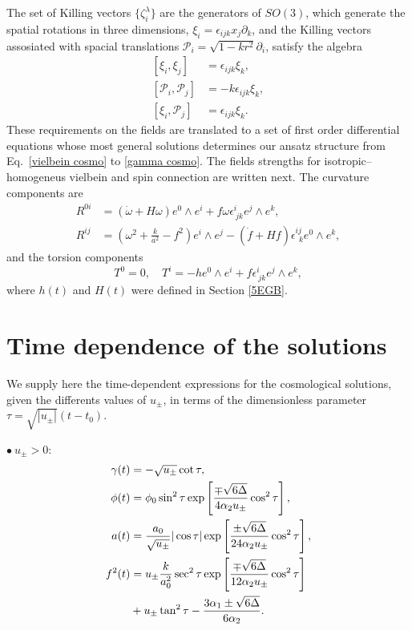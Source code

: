 \documentclass[aps,prd,12pt,superscriptaddress,showpacs,showkeys,longbibliography,reprint,nofootinbib]{revtex4-1}
\begin{document}
The set of Killing vectors $\{\zeta^\lambda_i\}$ are the generators of $SO(3)$, which generate the spatial rotations in three dimensions, $\xi_i=\epsilon_{ijk}x_j\partial_k$, and the Killing vectors assosiated with spacial translations $\mathcal{P}_i=\sqrt{1-kr^2}\partial_i$, satisfy the algebra
\begin{align}
  \left[\xi_i,\xi_j\right]&=\epsilon_{ijk}\xi_k,\\
  \left[\mathcal{P}_i,\mathcal{P}_j\right]&=-k\epsilon_{ijk}\xi_k,\\
  \left[\xi_i,\mathcal{P}_j\right]&=\epsilon_{ijk}\xi_k.
\end{align}
These requirements on the fields are translated to a set of first order differential equations whose most general solutions determines our ansatz structure from Eq.~\eqref{vielbein cosmo} to \eqref{gamma cosmo}. The fields strengths for isotropic--homogeneus vielbein and spin connection are written next. The curvature components are
\begin{align}
  R^{0i}&=\left(\dot{\omega}+H\omega\right)e^0\wedge e^i+f\omega\epsilon^i_{\ jk}e^j\wedge e^k,\\
  R^{ij}&=\left(\omega^2+\frac{k}{a^2}-f^2\right)e^i\wedge e^j
  -\left(\dot{f}+Hf\right)\epsilon^{ij}_{\ \ k}e^0\wedge e^k,
\end{align}
and the torsion components
\begin{equation}\label{homotorsion}
  T^0=0,\quad T^i=-he^0\wedge e^i+f\epsilon^i_{\ jk}e^j\wedge e^k,
\end{equation}
where $h(t)$ and $H(t)$ were defined in Section \ref{5EGB}.

\section{Time dependence of the solutions\label{solutions t}}

We supply here the time-dependent expressions for the cosmological solutions, given the differents values of $u_\pm$, in terms of the dimensionless parameter~$\tau=\sqrt{|u_\pm|}(t-t_0)$.
\medskip

$\bullet\ u_\pm>0$:
\begin{align}
  \gamma(t)&=-\sqrt{u_\pm}\cot\tau,\\
  \phi(t)&=\phi_0\sin^2\tau\exp\left[\frac{\mp\sqrt{6\Delta}}{4\alpha_2 u_\pm}\cos^2\tau\right],\\
  a(t)&=\frac{a_0}{\sqrt{u_\pm}}|\cos\tau|\exp\left[\frac{\pm\sqrt{6\Delta}}{24\alpha_2 u_\pm}\cos^2\tau\right],\\
  f^2(t)&=u_\pm\frac{k}{a_0^2}\sec^2\tau\exp\left[\frac{\mp\sqrt{6\Delta}}{12\alpha_2u_\pm}\cos^2\tau\right]\notag\\
  &+u_\pm\tan^2\tau - \frac{3\alpha_1\pm\sqrt{6\Delta}}{6\alpha_2}.
\end{align}
\end{document}
